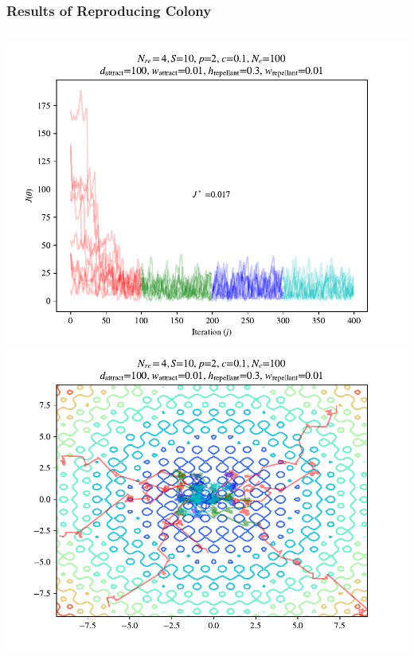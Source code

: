 \documentclass{beamer}
\begin{document}
\begin{frame}
\frametitle{Results of Reproducing Colony}
\begin{columns}
    \begin{center}
      \includegraphics[scale=0.3]{assets/rastrigin_colony_re_J}
      \includegraphics[scale=0.3]{assets/rastrigin_colony_re_theta}
    \end{center}
\end{columns}
\end{frame}




%
\end{document}
